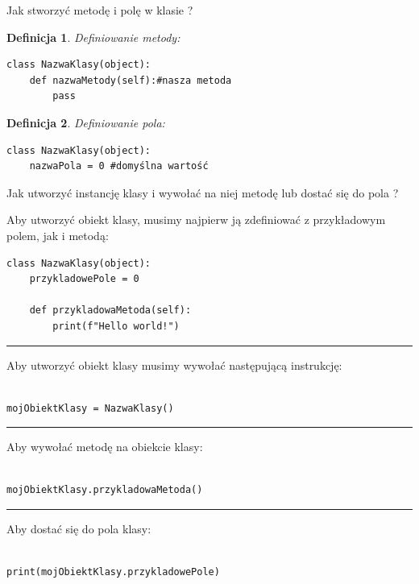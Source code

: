 \documentclass{beamer}
\newtheorem{twierdzenieBlok}{Definicja}
\begin{document}
\begin{frame}[fragile]{Jak stworzyć metodę i polę w klasie ?}
	\pause
	\begin{twierdzenieBlok}
		\footnotesize Definiowanie metody:
  		\scriptsize
		\begin{verbatim}
class NazwaKlasy(object):
	def nazwaMetody(self):#nasza metoda
		pass	
		\end{verbatim}
	\end{twierdzenieBlok}
	\pause

	\begin{twierdzenieBlok}
		\footnotesize Definiowanie pola:
  		\scriptsize
		\begin{verbatim}
class NazwaKlasy(object):
	nazwaPola = 0 #domyślna wartość	
		\end{verbatim}
	\end{twierdzenieBlok}
\end{frame}

\begin{frame}[fragile]{Jak utworzyć instancję klasy i wywołać na niej metodę lub dostać się do pola ?}

			\scriptsize
			\tiny Aby utworzyć obiekt klasy, musimy najpierw ją zdefiniować z przykładowym polem, jak i metodą: 
			\begin{verbatim}
class NazwaKlasy(object):
	przykladowePole = 0
	
	def przykladowaMetoda(self):
		print(f"Hello world!")

			\end{verbatim}
			\pause
			
			\rule{\textwidth}{1pt}

			Aby utworzyć obiekt klasy musimy wywołać następującą instrukcję:
			\begin{verbatim}

mojObiektKlasy = NazwaKlasy()

			\end{verbatim}
			\pause

			\rule{\textwidth}{1pt}

			Aby wywołać metodę na obiekcie klasy:
			\begin{verbatim}

mojObiektKlasy.przykladowaMetoda()

			\end{verbatim}
			\pause

			\rule{\textwidth}{1pt}

			Aby dostać się do pola klasy:
			\begin{verbatim}

print(mojObiektKlasy.przykladowePole)

			\end{verbatim}
	
\end{frame}
\end{document}

